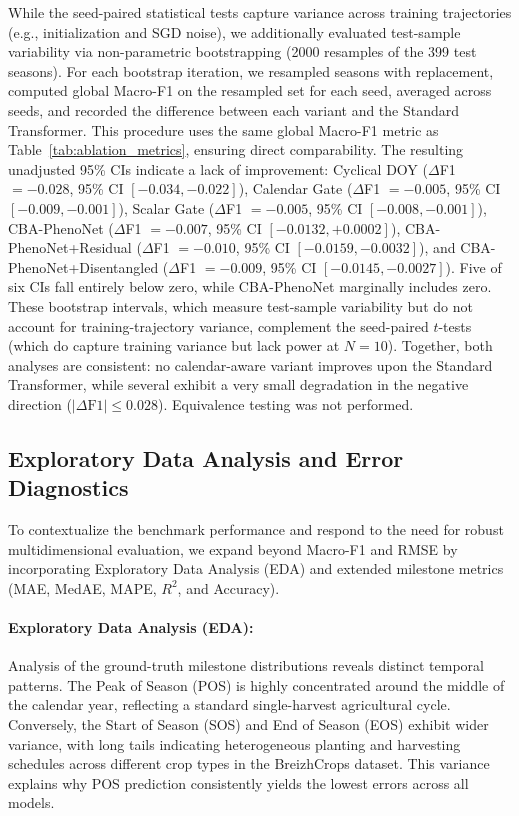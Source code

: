 \documentclass[runningheads]{llncs}
\begin{document}
While the seed-paired statistical tests capture variance across training trajectories (e.g., initialization and SGD noise), we additionally evaluated test-sample variability via non-parametric bootstrapping (2000 resamples of the 399 test seasons). For each bootstrap iteration, we resampled seasons with replacement, computed global Macro-F1 on the resampled set for each seed, averaged across seeds, and recorded the difference between each variant and the Standard Transformer. This procedure uses the same global Macro-F1 metric as Table~\ref{tab:ablation_metrics}, ensuring direct comparability. The resulting unadjusted 95\% CIs indicate a lack of improvement: Cyclical DOY ($\Delta$F1 $= -0.028$, 95\% CI $[-0.034, -0.022]$), Calendar Gate ($\Delta$F1 $= -0.005$, 95\% CI $[-0.009, -0.001]$), Scalar Gate ($\Delta$F1 $= -0.005$, 95\% CI $[-0.008, -0.001]$), CBA-PhenoNet ($\Delta$F1 $= -0.007$, 95\% CI $[-0.0132, +0.0002]$), CBA-PhenoNet+Residual ($\Delta$F1 $= -0.010$, 95\% CI $[-0.0159, -0.0032]$), and CBA-PhenoNet+Disentangled ($\Delta$F1 $= -0.009$, 95\% CI $[-0.0145, -0.0027]$). Five of six CIs fall entirely below zero, while CBA-PhenoNet marginally includes zero. These bootstrap intervals, which measure test-sample variability but do not account for training-trajectory variance, complement the seed-paired $t$-tests (which do capture training variance but lack power at $N{=}10$). Together, both analyses are consistent: no calendar-aware variant improves upon the Standard Transformer, while several exhibit a very small degradation in the negative direction ($|\Delta\text{F1}| \leq 0.028$). Equivalence testing was not performed.

\subsection{Exploratory Data Analysis and Error Diagnostics}
To contextualize the benchmark performance and respond to the need for robust multidimensional evaluation, we expand beyond Macro-F1 and RMSE by incorporating Exploratory Data Analysis (EDA) and extended milestone metrics (MAE, MedAE, MAPE, $R^2$, and Accuracy). 

\paragraph{Exploratory Data Analysis (EDA):}
Analysis of the ground-truth milestone distributions reveals distinct temporal patterns. The Peak of Season (POS) is highly concentrated around the middle of the calendar year, reflecting a standard single-harvest agricultural cycle. Conversely, the Start of Season (SOS) and End of Season (EOS) exhibit wider variance, with long tails indicating heterogeneous planting and harvesting schedules across different crop types in the BreizhCrops dataset. This variance explains why POS prediction consistently yields the lowest errors across all models.
\end{document}
